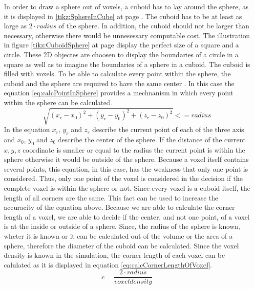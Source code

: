 In order to draw a sphere out of voxels, a cuboid has to lay around the sphere, as it is displayed in \ref{tikz:SphereInCube} at page \pageref{tikz:SphereInCube}. The cuboid has to be at least as large as $2 \cdot radius$ of the sphere. In addition, the cuboid should not be larger than necessary, otherwise there would be unnesessary computable cost. The illustration in figure \ref{tikz:CuboidSphere} at page \pageref{tikz:CuboidSphere} display the perfect size of a square and a circle. These 2D objectes are choosen to display the boundaries of a circle in a square as well as to imagine the boundaries of a sphere in a cuboid. \newline
The cuboid is filled with voxels. To be able to calculate every point within the sphere, the cuboid and the sphere are required to have the same center \cite{REF}. In this case the equation \ref{eq:calcPointInSphere} provides a mechnanism in which every point within the sphere can be calculated.
\begin{equation}\label{eq:calcPointInSphere}
\sqrt{(x_{r}-x_{0})^2 + (y_{r}-y_{0})^2 + (z_{r}-z_{0})^2} <= radius
\end{equation}
In the equation $x_{r}$, $y_{r}$ and $z_{r}$ describe the current point of each of the three axis and $x_{0}$, $y_{0}$ and $z_{0}$ describe the center of the sphere. If the distance of the current $x, y, z$ coordinate is smaller or equal to the radius the current point is within the sphere otherwise it would be outside of the sphere.
Because a voxel itself contains several points, this equation, in this case, has the weakness that only one point is considered. Thus, only one point of the voxel is considered in the decision if the complete voxel is within the sphere or not. Since every voxel is a cuboid itself, the length of all corners are the same. This fact can be used to increase the accuracity of the equation above. \newline
Because we are able to calculate the corner length of a voxel, we are able to decide if the center, and not one point, of a voxel is at the inside or outside of a sphere. Since, the radius of the sphere is known, wheter it is known or it can be calculated out of the volume or the area of a sphere, therefore the diameter of the cuboid can be calculated. Since the voxel density is known in the simulation, the corner length of each voxel can be calulated as it is displayed in equation \ref{eq:calcCornerLengthOfVoxel}.
\begin{equation}\label{eq:calcCornerLengthOfVoxel}
c = \dfrac{2 \cdot radius}{voxel density}
\end{equation}
